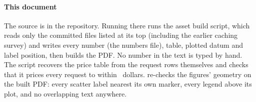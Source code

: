 \paragraph{This document} The source is in the repository. Running
 there runs the asset build script, which reads only the committed files listed at its top
(including the earlier caching survey) and writes every number
(the numbers file), table, plotted datum and label position, then builds the PDF. No number in
the text is typed by hand. The script recovers the price table from the request rows themselves and checks
that it prices every request to within \PriceResidual\ dollars.  re-checks the figures'
geometry on the built PDF: every scatter label nearest its own marker, every legend above its plot, and no
overlapping text anywhere.
